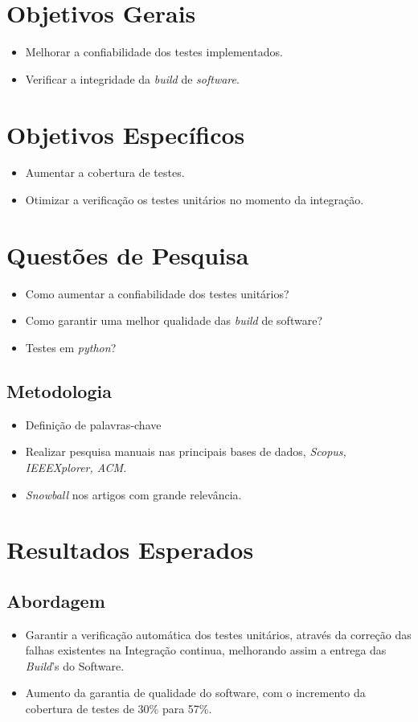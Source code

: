 \section{Objetivos Gerais}
\begin{itemize}
    \item Melhorar a confiabilidade dos testes implementados.
    \item Verificar a integridade da \textit{build} de \textit{software}.
\end{itemize}

\section{Objetivos Específicos }
\begin{itemize}
    \item Aumentar a cobertura de testes.
    \item Otimizar a verificação os testes unitários no momento da integração.
\end{itemize}

\section{Questões de Pesquisa}
\begin{itemize}
    \item Como aumentar a confiabilidade dos testes unitários?
    \item Como garantir uma melhor qualidade das \textit{build} de software?
    \item Testes em \textit{python}?
\end{itemize}

\subsection{Metodologia}
\begin{itemize}
    \item Definição de palavras-chave
    \item Realizar pesquisa manuais nas principais bases de dados,\textit{ Scopus, IEEEXplorer, ACM.}
    \item \textit{Snowball} nos artigos com grande relevância.
\end{itemize}

\section{Resultados Esperados}
\subsection{Abordagem}
\begin{itemize}
    \item Garantir a verificação automática dos testes unitários, através da correção das falhas existentes na Integração continua, melhorando assim a entrega das \textit{Build}'s do Software.
    \item Aumento da garantia de qualidade do software, com o incremento da cobertura de testes de 30\% para 57\%.
\end{itemize}

